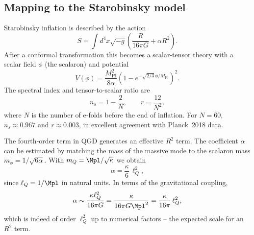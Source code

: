 \subsection{Mapping to the Starobinsky model}
Starobinsky inflation is described by the action
\begin{equation}
S = \int d^4x\sqrt{-g}\left(\frac{R}{16\pi G} + \alpha R^2\right).
\end{equation}
After a conformal transformation this becomes a scalar‑tensor theory with a scalar field $\phi$ (the scalaron) and potential
\begin{equation}
V(\phi) = \frac{M_{\mathrm{Pl}}^2}{8\alpha}\left(1 - e^{-\sqrt{2/3}\,\phi/M_{\mathrm{Pl}}}\right)^2.
\end{equation}
The spectral index and tensor‑to‑scalar ratio are
\begin{equation}
n_s = 1 - \frac{2}{N},\qquad r = \frac{12}{N^2},
\end{equation}
where $N$ is the number of e‑folds before the end of inflation. For $N=60$, $n_s\approx0.967$ and $r\approx0.003$, in excellent agreement with Planck~2018 data.

The fourth‑order term in QGD generates an effective $R^2$ term. The coefficient $\alpha$ can be estimated by matching the mass of the massive mode to the scalaron mass $m_\phi = 1/\sqrt{6\alpha}$. With $m_Q = \Mpl/\sqrt{\kappa}$ we obtain
\begin{equation}
\alpha = \frac{\kappa}{6}\,\ell_Q^2,
\end{equation}
since $\ell_Q = 1/\Mpl$ in natural units. In terms of the gravitational coupling,
\begin{equation}
\alpha \sim \frac{\kappa\ell_Q^2}{16\pi G} = \frac{\kappa}{16\pi G\Mpl^2} = \frac{\kappa}{16\pi}\,\ell_Q^2,
\end{equation}
which is indeed of order $\ell_Q^2$ up to numerical factors – the expected scale for an $R^2$ term.

